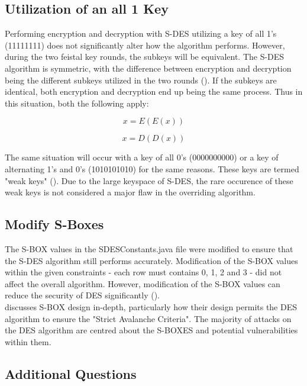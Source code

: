 \documentclass[]{article}
\begin{document}
\newpage
\subsection*{Utilization of an all 1 Key}

Performing encryption and decryption with S-DES utilizing a key of all 1's (11111111) does not significantly alter how the algorithm performs. However, during the two feistal key rounds, the subkeys will be equivalent. The S-DES algorithm is symmetric, with the difference between encryption and decryption being the different subkeys utilized in the two rounds (\cite{sdes_anal}). If the subkeys are identical, both encryption and decryption end up being the same process. Thus in this situation, both the following apply:

$$x=E( E(x) )$$

$$x=D( D(x) )$$

The same situation will occur with a key of all 0's (0000000000) or a key of alternating 1's and 0's (1010101010) for the same reasons. These keys are termed "weak keys" (\cite{alttext}). Due to the large keyspace of S-DES, the rare occurence of these weak keys is not considered a major flaw in the overriding algorithm.

\subsection*{Modify S-Boxes}


The S-BOX values in the SDESConstants.java file were modified to ensure that the S-DES algorithm still performs accurately. Modification of the S-BOX values within the given constraints - each row must contains 0, 1, 2 and 3 - did not affect the overall algorithm. However, modification of the S-BOX values can reduce the security of DES significantly (\cite{maintext}).\\

\cite{sans} discusses S-BOX design in-depth, particularly how their design permits the DES algorithm to ensure the "Strict Avalanche Criteria". The majority of attacks on the DES algorithm are centred about the S-BOXES and potential vulnerabilities within them.

\break

\vspace*{-0.8cm}
\begin{center}
	\section*{Additional Questions}
\end{center}
\end{document}
